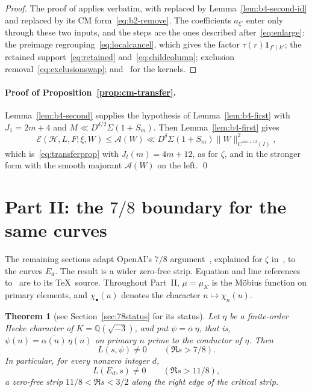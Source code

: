 \documentclass[11pt]{article}
\numberwithin{equation}{section}
\newcommand{\muk}{\mu_K}
\newcommand{\ind}{\mathbf1}
\newcommand{\E}{\mathcal E}
\newtheorem{theorem}{Theorem}
\begin{document}
\begin{proof}
The proof of \cite[Lemma~7.3]{OAI1112} applies verbatim, with \cite[Lemma~7.2]{OAI1112} replaced by
Lemma~\ref{lem:b4-second-id} and \cite[Lemma~4.4]{OAI1112} replaced by its CM form~\eqref{eq:b2-remove}.
The coefficients $a_{\xi'}$ enter only through these two inputs, and the steps are the ones described
after~\eqref{eq:enlarge}: the preimage regrouping~\eqref{eq:localcancel}, which gives the factor
$\tau(r)\ind_{f'\mid k'}$; the retained support~\eqref{eq:retained} and~\eqref{eq:childcolumn}; exclusion
removal~\eqref{eq:exclusionswap}; and~\cite[Lemma~B.2]{OAI1112} for the kernels.
\end{proof}

\paragraph{Proof of Proposition~\ref{prop:cm-transfer}.} Lemma~\ref{lem:b4-second} supplies the
hypothesis of Lemma~\ref{lem:b4-first} with $J_1=2m+4$ and $M\ll D^{\delta/2}\Sigma(1+S_m)$. Then
Lemma~\ref{lem:b4-first} gives
\begin{equation}\label{eq:d070}
 \E(\mathcal H,L,F;\xi,W)\le\mathcal A(W)\ll D^{\delta}\Sigma(1+S_m)\|W\|_{C^{4m+12}(I)}^2,
\end{equation}
which is~\eqref{eq:transferprop} with $J_t(m)=4m+12$, as for $\zeta$, and in the stronger form with
the smooth majorant $\mathcal A(W)$ on the left. \qed

\clearpage
\section{Part II: the \texorpdfstring{$7/8$}{7/8} boundary for the same curves}\label{sec:78}

The remaining sections adapt OpenAI's $7/8$ argument~\cite{OAI78}, explained
for $\zeta$ in~\cite{G78}, to the curves $E_d$. The result is a wider
zero-free strip. Equation and line references to~\cite{OAI78} are to its
\TeX\ source. Throughout Part~II, $\mu=\muk$ is the M\"obius function on primary
elements, and $\chi_\bullet(u)$ denotes the character $n\mapsto\chi_n(u)$.

\begin{theorem}[see Section~\ref{sec:78status} for its status]\label{thm:78}
Let $\eta$ be a finite-order Hecke character of $K=\mathbb Q(\sqrt{-3})$, and put
$\psi=\overline\alpha\,\eta$, that is, $\psi(n)=\overline{\alpha(n)}\,\eta(n)$ on
primary $n$ prime to the conductor of $\eta$. Then
\begin{equation}\label{eq:d071}
 L(s,\psi)\ne0\qquad(\Re s>7/8).
\end{equation}
In particular, for every nonzero integer $d$,
\begin{equation}\label{eq:d072}
 L(E_d,s)\ne0\qquad(\Re s>11/8),
\end{equation}
a zero-free strip $11/8<\Re s<3/2$ along the right edge of the critical strip.
\end{theorem}
\end{document}
